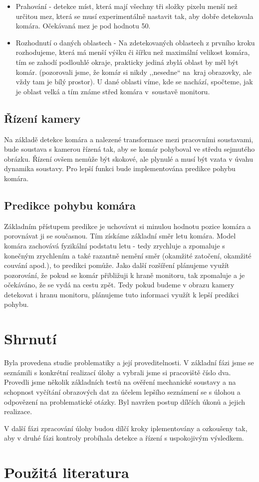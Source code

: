 \documentclass[a4paper,10pt]{article}
\begin{document}
\begin{itemize}
 \item Prahování - detekce míst, která mají všechny tři složky pixelu menší než určitou mez, která se musí experimentálně nastavit tak, aby dobře detekovala komára. Očekávaná mez je pod hodnotu 50.
 \item Rozhodnutí o daných oblastech - Na zdetekovaných oblastech z prvního kroku rozhodujeme, která má menší výšku či šířku než maximální velikost komára, tím se zahodí podlouhlé okraje, prakticky jediná zbylá oblast by měl být komár. (pozorovali jsme, že komár si nikdy ,,nesedne`` na~kraj obrazovky, ale vždy tam je bílý prostor). U dané oblasti víme, kde se nachází, spočteme, jak je oblast velká a tím známe střed komára v~soustavě monitoru.
\end{itemize}

\subsection{Řízení kamery}
Na základě detekce komára a nalezené transformace mezi pracovními soustavami, bude soustava s kamerou řízená tak, aby se komár pohyboval ve středu sejmutého obrázku. Řízení ovšem nemůže být skokové, ale plynulé a musí být vzata v úvahu dynamika soustavy. Pro lepší funkci bude implementována predikce pohybu komára.

\subsection{Predikce pohybu komára}

Základním přístupem predikce je uchovávat si minulou hodnotu pozice komára a porovnávat ji se současnou. Tím získáme základní směr letu komára. Model komára zachovává fyzikální podstatu letu - tedy zrychluje a zpomaluje s konečným zrychlením a také razantně nemění směr (okamžité zatočení, okamžité couvání apod.), to predikci pomůže. Jako další rozšíření plánujeme využít pozorování, že pokud se komár přibližuji k hraně monitoru, tak zpomaluje a je očekáváno, že se vydá na cestu zpět. Tedy pokud budeme v obrazu kamery detekovat i hranu monitoru, plánujeme tuto informaci využít k lepší predikci pohybu.

\section{Shrnutí}

Byla provedena studie problematiky a její proveditelnosti. V základní fázi jsme se seznámili s konkrétní realizací úlohy a vybrali jsme si pracoviště číslo dva. Provedli jsme několik základních testů na ověření mechanické soustavy a na schopnost vyčítání obrazových dat za účelem lepšího seznámení se s úlohou a odpovězení na problematické otázky. Byl navržen postup dílčích úkonů a jejich realizace.

V další fázi zpracování úlohy budou dílčí kroky iplementovány a ozkoušeny tak, aby v druhé fázi kontroly probíhala detekce a řízení s  uspokojivým výsledkem.

\section*{Použitá literatura}


\end{document}
